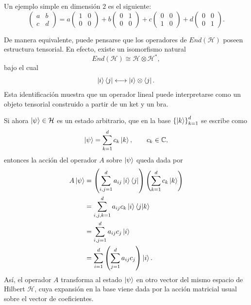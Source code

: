 \documentclass[12pt,a4paper]{article}
\theoremstyle{definition}
\theoremstyle{plain}
\theoremstyle{remark}
\newcommand{\C}{\mathbb{C}}
\newcommand{\Hil}{\mathcal{H}}
\begin{document}
Un ejemplo simple en dimensión $2$ es el siguiente:
\begin{equation*}
    \begin{pmatrix}
        a & b\\
        c & d
    \end{pmatrix}
    =
    a
    \begin{pmatrix}
        1 & 0\\
        0 & 0
    \end{pmatrix}
    +
    b
    \begin{pmatrix}
        0 & 1\\
        0 & 0
    \end{pmatrix}
    +
    c
    \begin{pmatrix}
        0 & 0\\
        1 & 0
    \end{pmatrix}
    +
    d
    \begin{pmatrix}
        0 & 0\\
        0 & 1
    \end{pmatrix}.
\end{equation*}

De manera equivalente, puede pensarse que los operadores de $End(\Hil)$ poseen estructura tensorial. En efecto, existe un isomorfismo natural
\begin{equation*}
    End(\Hil)\cong \Hil\otimes \Hil^{*},
\end{equation*}
bajo el cual
\begin{equation*}
    \ket{i}\bra{j}\longleftrightarrow \ket{i}\otimes \bra{j}.
\end{equation*}
Esta identificación muestra que un operador lineal puede interpretarse como un objeto tensorial construido a partir de un ket y un bra.

Si ahora $\ket{\psi}\in\Hil$ es un estado arbitrario, que en la base $\left\{\ket{k}\right\}_{k=1}^{d}$ se escribe como
\begin{equation*}
    \ket{\psi}=\sum_{k=1}^{d} c_k \ket{k},
    \qquad c_k\in\C,
\end{equation*}
entonces la acción del operador $A$ sobre $\ket{\psi}$ queda dada por
\begin{align*}
    A\ket{\psi}
    &=
    \left(
        \sum_{i,j=1}^{d} a_{ij}\ket{i}\bra{j}
    \right)
    \left(
        \sum_{k=1}^{d} c_k\ket{k}
    \right)\\
    &=
    \sum_{i,j,k=1}^{d} a_{ij}c_k \ket{i}\braket{j|k}\\
    &=
    \sum_{i,j=1}^{d} a_{ij}c_j \ket{i}\\
    &=
    \sum_{i=1}^{d}
    \left(
        \sum_{j=1}^{d} a_{ij}c_j
    \right)\ket{i}.
\end{align*}
Así, el operador $A$ transforma al estado $\ket{\psi}$ en otro vector del mismo espacio de Hilbert $\Hil$, cuya expansión en la base viene dada por la acción matricial usual sobre el vector de coeficientes.
\end{document}
